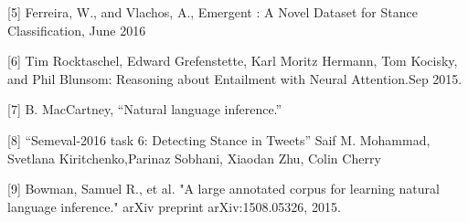 \documentclass[11pt]{extarticle}
\begin{document}
[5] Ferreira, W., and Vlachos, A., Emergent : A Novel Dataset for Stance Classification, June 2016

[6] Tim Rocktaschel, Edward Grefenstette, Karl Moritz Hermann, Tom Kocisky, and Phil Blunsom: Reasoning about Entailment with Neural Attention.Sep 2015.

[7] B. MacCartney, “Natural language inference.” 

[8] “Semeval-2016 task 6: Detecting Stance in Tweets” Saif M. Mohammad, Svetlana Kiritchenko,Parinaz Sobhani, Xiaodan Zhu, Colin Cherry

[9] Bowman, Samuel R., et al. "A large annotated corpus for learning natural language inference."  arXiv preprint arXiv:1508.05326,  2015.
\end{document}
